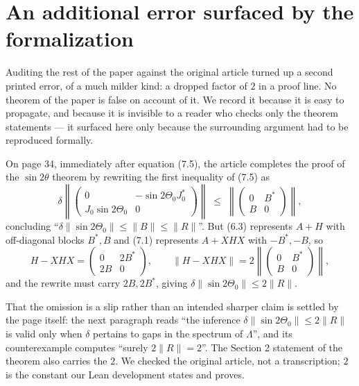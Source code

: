 \documentclass[11pt]{article}
\theoremstyle{definition}
\begin{document}
\section{An additional error surfaced by the formalization}
\label{sec:section7}

Auditing the rest of the paper against the original article turned up a second
printed error, of a much milder kind: a dropped factor of $2$ in a proof line.
No theorem of the paper is false on account of it.  We record it because it is
easy to propagate, and because it is invisible to a reader who checks only the
theorem statements --- it surfaced here only because the surrounding argument
had to be reproduced formally.

On page 34, immediately after equation (7.5), the article completes the proof of
the $\sin2\theta$ theorem by rewriting the first inequality of (7.5) as
\[
 \delta\left\lVert
 \begin{pmatrix} 0 & -\sin2\Theta_0 J_0^{*}\\ J_0\sin2\Theta_0 & 0\end{pmatrix}
 \right\rVert
 \;\leq\;
 \left\lVert \begin{pmatrix} 0 & B^{*}\\ B & 0\end{pmatrix} \right\rVert ,
\]
concluding ``$\delta\lVert\sin2\Theta_0\rVert\leq\lVert B\rVert\leq\lVert
R\rVert$''.  But (6.3) represents $A+H$ with off-diagonal blocks $B^{*},B$ and
(7.1) represents $A+XHX$ with $-B^{*},-B$, so
\[
 H-XHX=\begin{pmatrix} 0 & 2B^{*}\\ 2B & 0\end{pmatrix},
 \qquad
 \lVert H-XHX\rVert=2\left\lVert\begin{pmatrix}0&B^{*}\\B&0\end{pmatrix}\right\rVert ,
\]
and the rewrite must carry $2B,2B^{*}$, giving
$\delta\lVert\sin2\Theta_0\rVert\leq2\lVert R\rVert$.

That the omission is a slip rather than an intended sharper claim is settled by
the page itself: the next paragraph reads ``the inference
$\delta\lVert\sin2\Theta_0\rVert\leq2\lVert R\rVert$ is valid only when $\delta$
pertains to gaps in the spectrum of $\Lambda$'', and its counterexample computes
``surely $2\lVert R\rVert=2$''.  The Section 2 statement of the theorem also
carries the $2$.  We checked the original article, not a transcription; $2$ is
the constant our Lean development states and proves.
\end{document}
